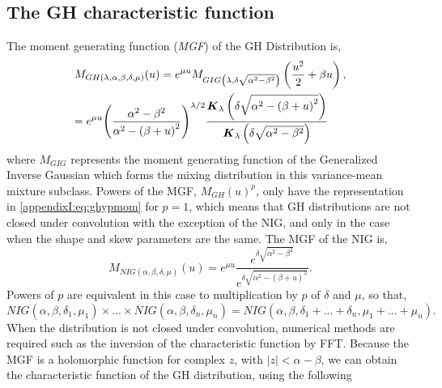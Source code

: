 \subsection*{The GH characteristic function}\label{appendixI}
The moment generating function (\emph{MGF}) of the GH Distribution is,
\begin{equation}\label{appendixI:eq:ghypmom}
\begin{gathered}
  {M_{GH(\lambda ,\alpha ,\beta ,\delta ,\mu )}}(u) = {e^{\mu u}}{M_{GIG\left( {\lambda ,\delta \sqrt {{\alpha ^2} - {\beta ^2}} } \right)}}\left( {\frac{{{u^2}}}{2} + \beta u} \right), \hfill \\
   = {e^{\mu u}}{\left( {\frac{{{\alpha ^2} - {\beta ^2}}}{{{\alpha ^2} - {{(\beta  + u)}^2}}}} \right)^{\lambda /2}}\frac{{{\bfK_\lambda }\left( {\delta \sqrt {{\alpha ^2} - {{(\beta  + u)}^2}} } \right)}}{{{\bfK_\lambda }\left( {\delta \sqrt {{\alpha ^2} - {\beta ^2}} } \right)}} \hfill \\
\end{gathered}
\end{equation}
where $M_{GIG}$ represents the moment generating function of the Generalized Inverse
Gaussian which forms the mixing distribution in this variance-mean mixture subclass.
Powers of the MGF, $M_{GH}(u)^p$, only have the representation in \eqref{appendixI:eq:ghypmom}
for $p=1$, which means that GH distributions are not closed under convolution
with the exception of the NIG, and only in the case when the shape and skew parameters
are the same. The MGF of the NIG is,
\begin{equation}\label{appendixI:eq:nigmom}
{M_{NIG(\alpha ,\beta ,\delta ,\mu )}}(u) = {e^{\mu u}}\frac{{{e^{\delta \sqrt {{\alpha ^2} - {\beta ^2}} }}}}{{{e^{\delta \sqrt {{\alpha ^2} - {{(\beta  + u)}^2}} }}}}.
\end{equation}
Powers of $p$ are equivalent in this case to multiplication by $p$ of $\delta$ and $\mu$, so that,
\begin{equation}\label{appendixI:eq:closednig}
NIG(\alpha ,\beta ,{\delta _1},{\mu _1}) \times...\times NIG(\alpha ,\beta ,{\delta _n},{\mu _n}) = NIG(\alpha ,\beta ,{\delta _1} + ... + {\delta _n},{\mu _1} + ... + {\mu _n}).
\end{equation}
When the distribution is not closed under convolution, numerical methods are
required such as the inversion of the characteristic function by FFT. Because the
MGF is a holomorphic function for complex $z$, with $\left| z \right| < \alpha  - \beta$,
we can obtain the characteristic function of the GH distribution, using the following
